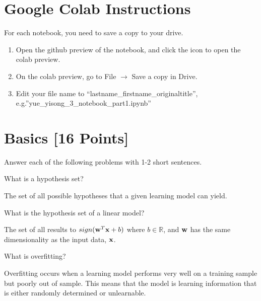 \section*{Google Colab Instructions}

For each notebook, you need to save a copy to your drive.

\begin{enumerate}
	\item Open the github preview of the notebook, and click the icon to open the colab preview.
	\item On the colab preview, go to File $\rightarrow$ Save a copy in Drive.
	\item Edit your file name to “lastname_firstname_originaltitle”, e.g.”yue_yisong_3_notebook_part1.ipynb”
\end{enumerate}


\newpage
\section{Basics [16 Points]}

Answer each of the following problems with 1-2 short sentences.

\begin{problem}[2]
  What is a hypothesis set?
\end{problem}
\begin{solution}
  The set of all possible hypotheses that a given learning model
  can yield.
\end{solution}

\begin{problem}[2]
  What is the hypothesis set of a linear model?
\end{problem}
\begin{solution}
  The set of all results to $sign(\bold{w}^T\bold{x} +b)$
  where $b \in \mathbb{R}$, and $\bold{w}$ has the same 
  dimensionality as the input data, $\bold{x}$.
\end{solution}

\begin{problem}[2]
  What is overfitting?
\end{problem}
\begin{solution}
  Overfitting occurs when a learning model performs very well on
  a training sample but poorly out of sample. This means that
  the model is learning information that is either randomly
  determined or unlearnable.
\end{solution}

